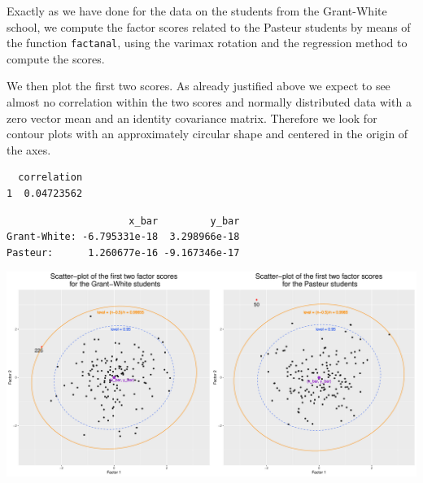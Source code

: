 \documentclass[
  letterpaper,
  DIV=11,
  numbers=noendperiod]{scrartcl}
\newenvironment{Shaded}{\begin{snugshade}}{\end{snugshade}}
\newcommand{\AttributeTok}[1]{\textcolor[rgb]{0.40,0.45,0.13}{#1}}
\newcommand{\DecValTok}[1]{\textcolor[rgb]{0.68,0.00,0.00}{#1}}
\newcommand{\FloatTok}[1]{\textcolor[rgb]{0.68,0.00,0.00}{#1}}
\newcommand{\FunctionTok}[1]{\textcolor[rgb]{0.28,0.35,0.67}{#1}}
\newcommand{\NormalTok}[1]{\textcolor[rgb]{0.00,0.23,0.31}{#1}}
\newcommand{\OtherTok}[1]{\textcolor[rgb]{0.00,0.23,0.31}{#1}}
\newcommand{\SpecialCharTok}[1]{\textcolor[rgb]{0.37,0.37,0.37}{#1}}
\newcommand{\StringTok}[1]{\textcolor[rgb]{0.13,0.47,0.30}{#1}}
\begin{document}
Exactly as we have done for the data on the students from the
Grant-White school, we compute the factor scores related to the Pasteur
students by means of the function \texttt{factanal}, using the varimax
rotation and the regression method to compute the scores.

\begin{Shaded}
\end{Shaded}

We then plot the first two scores. As already justified above we expect
to see almost no correlation within the two scores and normally
distributed data with a zero vector mean and an identity covariance
matrix. Therefore we look for contour plots with an approximately
circular shape and centered in the origin of the axes.

\begin{verbatim}
  correlation
1  0.04723562
\end{verbatim}

\begin{verbatim}
                     x_bar         y_bar
Grant-White: -6.795331e-18  3.298966e-18
Pasteur:      1.260677e-16 -9.167346e-17
\end{verbatim}

\includegraphics{ProblemSet2_files/figure-pdf/unnamed-chunk-57-1.pdf}
\end{document}
